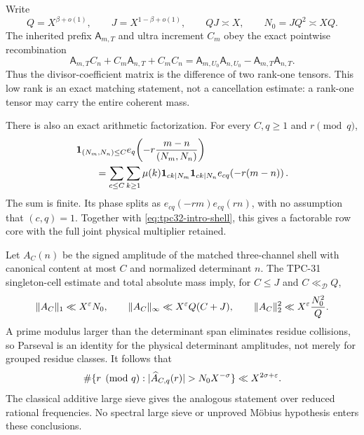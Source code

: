 Write
\begin{equation}
 Q=X^{\beta+o(1)},
 \qquad
 J=X^{1-\beta+o(1)},
 \qquad
 QJ\asymp X,
 \qquad
 N_0=JQ^2\asymp XQ.
 \label{eq:tpc32-intro-scales}
\end{equation}
The inherited prefix $\mathsf A_{m,T}$ and ultra increment $C_m$ obey
the exact pointwise recombination
\begin{equation}
 \mathsf A_{m,T}C_n+C_m\mathsf A_{n,T}+C_mC_n
 =\mathsf A_{m,U_0}\mathsf A_{n,U_0}
  -\mathsf A_{m,T}\mathsf A_{n,T}.
 \label{eq:tpc32-intro-shell}
\end{equation}
Thus the divisor-coefficient matrix is the difference of two rank-one
tensors.  This low rank is an exact matching statement, not a cancellation
estimate: a rank-one tensor may carry the entire coherent mass.

There is also an exact arithmetic factorization.  For every $C,q\ge1$ and
$r\pmod q$,
\begin{align}
 &\mathbf 1_{(N_m,N_n)\le C}
 e_q\!\left(-r\frac{m-n}{(N_m,N_n)}\right)
 \notag\\
 &\qquad=
 \sum_{c\le C}\sum_{k\ge1}\mu(k)
 \mathbf 1_{ck\mid N_m}\mathbf 1_{ck\mid N_n}
 e_{cq}\!\left(-r(m-n)\right).
 \label{eq:tpc32-intro-content-factorization}
\end{align}
The sum is finite.  Its phase splits as
$e_{cq}(-rm)e_{cq}(rn)$, with no assumption that $(c,q)=1$.
Together with \eqref{eq:tpc32-intro-shell}, this gives a factorable row
core with the full joint physical multiplier retained.

Let $A_C(n)$ be the signed amplitude of the matched three-channel shell
with canonical content at most $C$ and normalized determinant $n$.  The
TPC-31 singleton-cell estimate and total absolute mass imply, for
$C\le J$ and $C\ll_{\mathscr D}Q$,
\begin{equation}
 \|A_C\|_1\ll X^\varepsilon N_0,
 \qquad
 \|A_C\|_\infty\ll X^\varepsilon Q(C+J),
 \qquad
 \|A_C\|_2^2\ll X^\varepsilon\frac{N_0^2}{Q}.
 \label{eq:tpc32-intro-norms}
\end{equation}
A prime modulus larger than the determinant span eliminates residue
collisions, so Parseval is an identity for the physical determinant
amplitudes, not merely for grouped residue classes.  It follows that
\begin{equation}
 \#\{r\pmod q:|\widehat A_{C,q}(r)|>N_0X^{-\sigma}\}
 \ll X^{2\sigma+\eps}.
 \label{eq:tpc32-intro-exceptional}
\end{equation}
The classical additive large sieve gives the analogous statement over
reduced rational frequencies.  No spectral large sieve or unproved
M\"obius hypothesis enters these conclusions.

